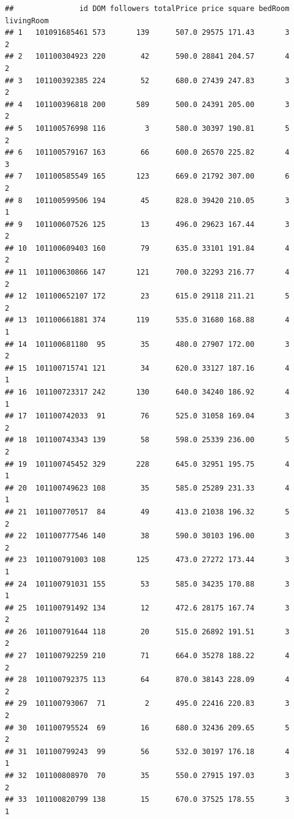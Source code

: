 \documentclass[
]{article}
\begin{document}
\begin{verbatim}
##               id DOM followers totalPrice price square bedRoom livingRoom
## 1   101091685461 573       139      507.0 29575 171.43       3          2
## 2   101100304923 220        42      590.0 28841 204.57       4          2
## 3   101100392385 224        52      680.0 27439 247.83       3          2
## 4   101100396818 200       589      500.0 24391 205.00       3          2
## 5   101100576998 116         3      580.0 30397 190.81       5          2
## 6   101100579167 163        66      600.0 26570 225.82       4          3
## 7   101100585549 165       123      669.0 21792 307.00       6          2
## 8   101100599506 194        45      828.0 39420 210.05       3          1
## 9   101100607526 125        13      496.0 29623 167.44       3          2
## 10  101100609403 160        79      635.0 33101 191.84       4          2
## 11  101100630866 147       121      700.0 32293 216.77       4          2
## 12  101100652107 172        23      615.0 29118 211.21       5          2
## 13  101100661881 374       119      535.0 31680 168.88       4          1
## 14  101100681180  95        35      480.0 27907 172.00       3          2
## 15  101100715741 121        34      620.0 33127 187.16       4          1
## 16  101100723317 242       130      640.0 34240 186.92       4          1
## 17  101100742033  91        76      525.0 31058 169.04       3          2
## 18  101100743343 139        58      598.0 25339 236.00       5          2
## 19  101100745452 329       228      645.0 32951 195.75       4          1
## 20  101100749623 108        35      585.0 25289 231.33       4          1
## 21  101100770517  84        49      413.0 21038 196.32       5          2
## 22  101100777546 140        38      590.0 30103 196.00       3          2
## 23  101100791003 108       125      473.0 27272 173.44       3          1
## 24  101100791031 155        53      585.0 34235 170.88       3          1
## 25  101100791492 134        12      472.6 28175 167.74       3          2
## 26  101100791644 118        20      515.0 26892 191.51       3          2
## 27  101100792259 210        71      664.0 35278 188.22       4          2
## 28  101100792375 113        64      870.0 38143 228.09       4          2
## 29  101100793067  71         2      495.0 22416 220.83       3          2
## 30  101100795524  69        16      680.0 32436 209.65       5          2
## 31  101100799243  99        56      532.0 30197 176.18       4          1
## 32  101100808970  70        35      550.0 27915 197.03       3          2
## 33  101100820799 138        15      670.0 37525 178.55       3          1

\end{verbatim}
\end{document}
